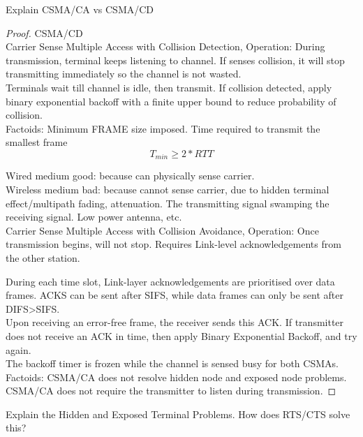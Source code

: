 \documentclass[../main.tex]{subfiles}
\begin{document}
\providecommand{\wl}{\mathcal{L}}

\begin{wts}
    Explain CSMA/CA vs CSMA/CD
\end{wts}
\begin{proof}
    
CSMA/CD\\ 
Carrier Sense Multiple Access with Collision Detection,
Operation: During transmission, terminal keeps listening to channel. If senses collision, it will stop transmitting immediately so the channel is not wasted.\\

Terminals wait till channel is idle, then transmit. If collision detected, apply binary exponential backoff with a finite upper bound to reduce probability of collision.\\

Factoids: Minimum FRAME size imposed. Time required to transmit the smallest frame \[T_{min}\geq 2* RTT\]

Wired medium good: because can physically sense carrier.\\

Wireless medium bad: because cannot sense carrier, due to hidden terminal effect/multipath fading, attenuation. The transmitting signal swamping the receiving signal. Low power antenna, etc.\\

Carrier Sense Multiple Access with Collision Avoidance,
Operation: Once transmission begins, will not stop. Requires Link-level acknowledgements from the other station. 

During each time slot, Link-layer acknowledgements are prioritised over data frames. ACKS can be sent after SIFS, while data frames can only be sent after DIFS>SIFS.\\

Upon receiving an error-free frame, the receiver sends this ACK. If transmitter does not receive an ACK in time, then apply Binary Exponential Backoff, and try again.\\

The backoff timer is frozen while the channel is sensed busy for both CSMAs.\\

Factoids: CSMA/CA does not resolve hidden node and exposed node problems.
CSMA/CA does not require the transmitter to listen during transmission.
\end{proof}\newpage
{}
\begin{wts}
    Explain the Hidden and Exposed Terminal Problems. How does RTS/CTS solve this?
\end{wts}
\end{document}
